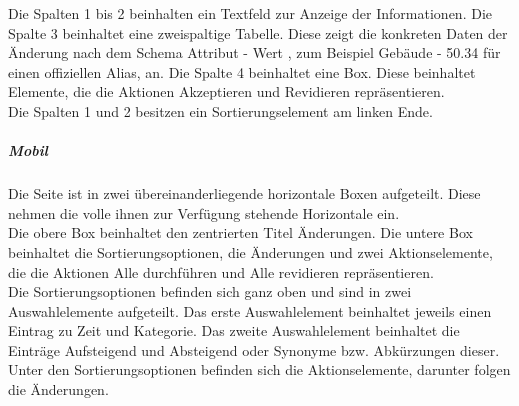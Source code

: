 Die Spalten 1 bis 2 beinhalten ein Textfeld zur Anzeige der Informationen.
Die Spalte 3 beinhaltet eine zweispaltige Tabelle. Diese zeigt die konkreten Daten der Änderung nach dem Schema \dq Attribut - Wert \dq{}, zum Beispiel \dq Gebäude - 50.34 \dq{} für einen offiziellen Alias, an.
Die Spalte 4 beinhaltet eine Box. Diese beinhaltet Elemente, die die Aktionen \dq Akzeptieren \dq{} und \dq Revidieren \dq{} repräsentieren. \\
Die Spalten 1 und 2 besitzen ein Sortierungselement am linken Ende.

\begin{center}
    \captionsetup[figure]{labelformat=empty}
    \captionsetup[figure]{labelformat=default}
\end{center}

\vspace{0.5em}
\begin{minipage}{\textwidth}
    \begin{minipage}{.5\textwidth}
        \subparagraph*{Mobil}
        Die Seite ist in zwei übereinanderliegende horizontale Boxen aufgeteilt. Diese nehmen die volle ihnen zur Verfügung stehende Horizontale ein. \\
        Die obere Box beinhaltet den zentrierten Titel \dq Änderungen\dq.
        Die untere Box beinhaltet die Sortierungsoptionen, die Änderungen und zwei Aktionselemente, die die Aktionen \dq Alle durchführen\dq{} und \dq Alle revidieren\dq{} repräsentieren. \\
        Die Sortierungsoptionen befinden sich ganz oben und sind in zwei Auswahlelemente aufgeteilt. 
        Das erste Auswahlelement beinhaltet jeweils einen Eintrag zu Zeit und Kategorie.
        Das zweite Auswahlelement beinhaltet die Einträge \dq Aufsteigend \dq{} und \dq Absteigend \dq{} oder Synonyme bzw. Abkürzungen dieser.\\
        Unter den Sortierungsoptionen befinden sich die Aktionselemente, darunter folgen die Änderungen.
    \end{minipage}
    \begin{minipage}{.5\textwidth}
        \hspace{.2\textwidth}
        \captionsetup[figure]{labelformat=empty}
        \captionsetup[figure]{labelformat=default}
    \end{minipage}
\end{minipage}
\vspace{0.5em}

